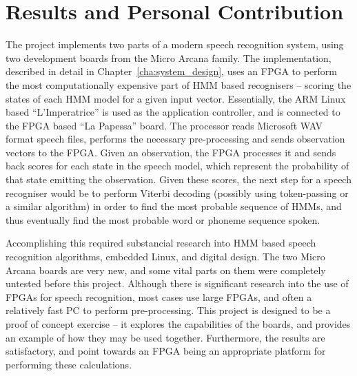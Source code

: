 \section{Results and Personal Contribution} %
\label{sec:contributions}
	The project implements two parts of a modern speech recognition system, using two development boards from the Micro Arcana family.  The implementation, described in detail in Chapter~\ref{cha:system_design}, uses an FPGA to perform the most computationally expensive part of HMM based recognisers -- scoring the states of each HMM model for a given input vector.  Essentially, the ARM Linux based ``L'Imperatrice'' is used as the application controller, and is connected to the FPGA based ``La Papessa'' board.  The processor reads Microsoft WAV format speech files, performs the necessary pre-processing and sends observation vectors to the FPGA.  Given an observation, the FPGA processes it and sends back scores for each state in the speech model, which represent the probability of that state emitting the observation.  Given these scores, the next step for a speech recogniser would be to perform Viterbi decoding (possibly using token-passing or a similar algorithm) in order to find the most probable sequence of HMMs, and thus eventually find the most probable word or phoneme sequence spoken.

	Accomplishing this required substancial research into HMM based speech recognition algorithms, embedded Linux, and digital design.  The two Micro Arcana boards are very new, and some vital parts on them were completely untested before this project.  Although there is significant research into the use of FPGAs for speech recognition, most cases use large FPGAs, and often a relatively fast PC to perform pre-processing.  This project is designed to be a proof of concept exercise -- it explores the capabilities of the boards, and provides an example of how they may be used together.  Furthermore, the results are satisfactory, and point towards an FPGA being an appropriate platform for performing these calculations.


